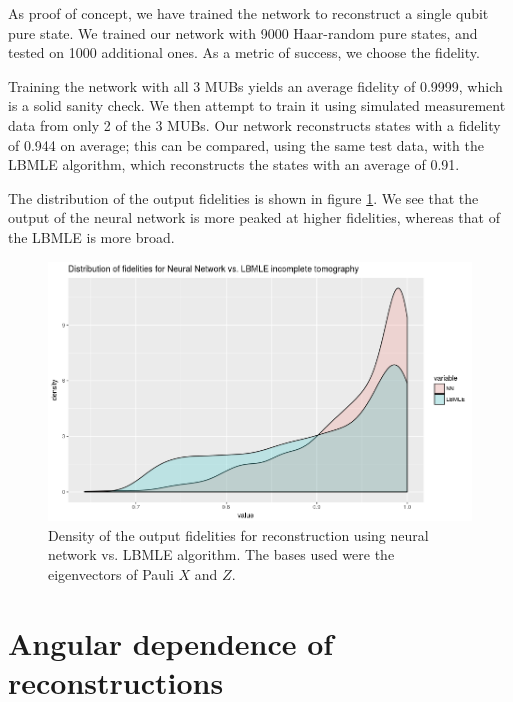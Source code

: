 \documentclass[a4paper,10pt]{article}
\begin{document}
As proof of concept, we have trained the network to reconstruct a single qubit pure state. We trained our network with 9000 Haar-random pure states, and tested on 1000 additional ones. As a metric of success, we choose the fidelity. 

Training the network with all 3 MUBs yields an average fidelity of 0.9999, which is a solid sanity check. We then attempt to train it using simulated measurement data from only 2 of the 3 MUBs.  Our network reconstructs states with a fidelity of 0.944 on average; this can be compared, using the same test data, with the LBMLE algorithm, which reconstructs the states with an average of 0.91.

The distribution of the output fidelities is shown in figure \ref{fig:fids_dim2}. We see that the output of the neural network is more peaked at higher fidelities, whereas that of the LBMLE is more broad.
\begin{figure}
 \includegraphics[scale=0.5]{fids_dim2}
 \caption{Density of the output fidelities for reconstruction using neural network vs. LBMLE algorithm. The bases used were the eigenvectors of Pauli $X$ and $Z$.}
 \label{fig:fids_dim2}
\end{figure}

\section{Angular dependence of reconstructions}
\end{document}
